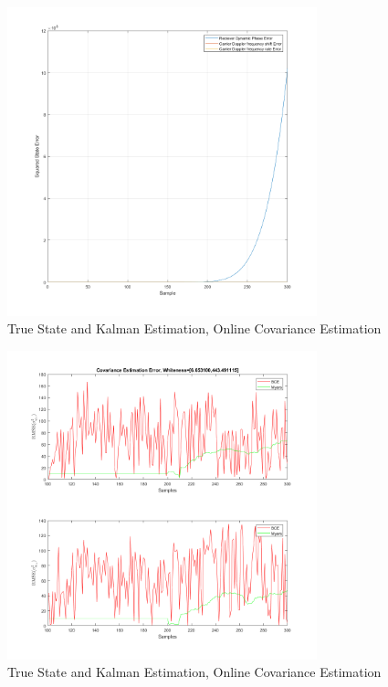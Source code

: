 \documentclass[11pt]{article}
\begin{document}
\begin{figure}[ht]
    \centering
    \includegraphics[width=0.8\textwidth]{Final Project/figures/on2.png}
    \caption{True State and Kalman Estimation, Online Covariance Estimation}
    \label{fig:on2}
\end{figure}

\begin{figure}[ht]
    \centering
    \includegraphics[width=0.8\textwidth]{Final Project/figures/on3.png}
    \caption{True State and Kalman Estimation, Online Covariance Estimation}
    \label{fig:on3}
\end{figure}
\end{document}
